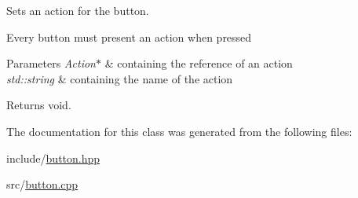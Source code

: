 Sets an action for the button. 

Every button must present an action when pressed


\begin{DoxyParams}{Parameters}
{\em Action$\ast$} & containing the reference of an action \\
\hline
{\em std\+::string} & containing the name of the action \\
\hline
\end{DoxyParams}
\begin{DoxyReturn}{Returns}
void. 
\end{DoxyReturn}


The documentation for this class was generated from the following files\+:\begin{DoxyCompactItemize}
\item 
include/\hyperlink{button_8hpp}{button.\+hpp}\item 
src/\hyperlink{button_8cpp}{button.\+cpp}\end{DoxyCompactItemize}
